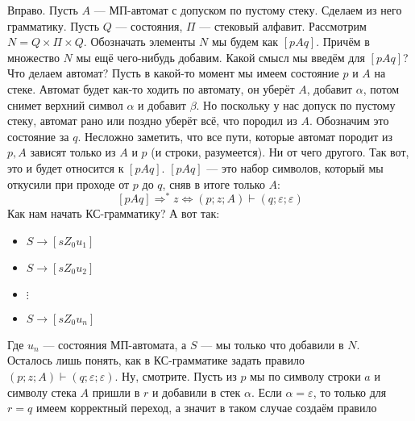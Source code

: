 \documentclass{article}
\begin{document}
\begin{itemize}
\begin{Proof}
\begin{Example}
\begin{figure}[H]
                \end{figure}\noindent
            \end{Example}
            Вправо. Пусть $A$ --- МП-автомат с допуском по пустому стеку. Сделаем из него грамматику. Пусть $Q$ --- состояния, $\Pi$ --- стековый алфавит. Рассмотрим $N=Q\times\Pi\times Q$. Обозначать элементы $N$ мы будем как $[pAq]$. Причём в множество $N$ мы ещё чего-нибудь добавим. Какой смысл мы введём для $[pAq]$? Что делаем автомат? Пусть в какой-то момент мы имеем состояние $p$ и $A$ на стеке. Автомат будет как-то ходить по автомату, он уберёт $A$, добавит $\alpha$, потом снимет верхний символ $\alpha$ и добавит $\beta$. Но поскольку у нас допуск по пустому стеку, автомат рано или поздно уберёт всё, что породил из $A$. Обозначим это состояние за $q$. Несложно заметить, что все пути, которые автомат породит из $p,A$ зависят только из $A$ и $p$ (и строки, разумеется). Ни от чего другого. Так вот, это и будет относится к $[pAq]$. $[pAq]$ --- это набор символов, который мы откусили при проходе от $p$ до $q$, сняв в итоге только $A$:
            $$
            [pAq]\Rightarrow^*z\Longleftrightarrow(p;z;A)\vdash(q;\varepsilon;\varepsilon)
            $$
            Как нам начать КС-грамматику? А вот так:
            \begin{itemize}
                \item $S\to[sZ_0u_1]$
                \item $S\to[sZ_0u_2]$
                \item $\vdots$
                \item $S\to[sZ_0u_n]$
            \end{itemize}
            Где $u_n$ --- состояния МП-автомата, а $S$ --- мы только что добавили в $N$.\\
            Осталось лишь понять, как в КС-грамматике задать правило $(p;z;A)\vdash(q;\varepsilon;\varepsilon)$. Ну, смотрите. Пусть из $p$ мы по символу строки $a$ и символу стека $A$ пришли в $r$ и добавили в стек $\alpha$. Если $\alpha=\varepsilon$, то только для $r=q$ имеем корректный переход, а значит в таком случае создаём правило

\end{Proof}
\end{itemize}
\end{document}

